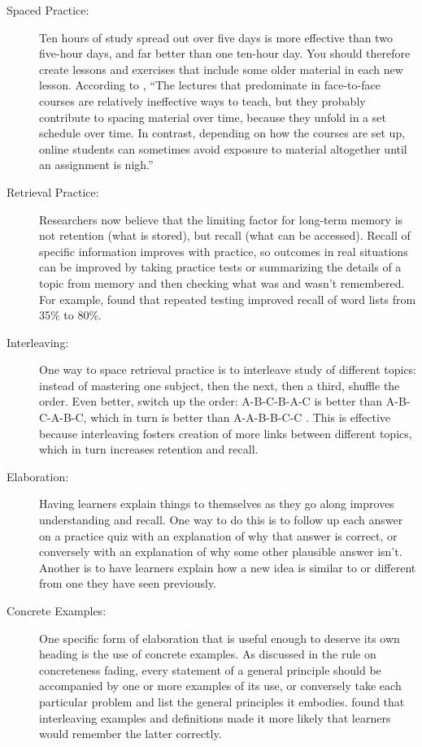 \documentclass[10pt,letterpaper]{article}
\begin{document}
\begin{description}

\item[Spaced Practice:] Ten hours of study spread out over five days is more
  effective than two five-hour days, and far better than one ten-hour day. You
  should therefore create lessons and exercises that include some older material
  in each new lesson.  According to \cite{Mill2016}, ``The lectures that
  predominate in face-to-face courses are relatively ineffective ways to teach,
  but they probably contribute to spacing material over time, because they
  unfold in a set schedule over time.  In contrast, depending on how the courses
  are set up, online students can sometimes avoid exposure to material
  altogether until an assignment is nigh.''

\item[Retrieval Practice:] Researchers now believe that the limiting factor for
  long-term memory is not retention (what is stored), but recall (what can be
  accessed).  Recall of specific information improves with practice, so outcomes
  in real situations can be improved by taking practice tests or summarizing the
  details of a topic from memory and then checking what was and wasn't
  remembered. For example, \cite{Karp2008} found that repeated testing improved
  recall of word lists from 35\% to 80\%.

\item[Interleaving:] One way to space retrieval practice is to interleave study
  of different topics: instead of mastering one subject, then the next, then a
  third, shuffle the order. Even better, switch up the order: A-B-C-B-A-C is
  better than A-B-C-A-B-C, which in turn is better than A-A-B-B-C-C
  \cite{Rohr2015}. This is effective because interleaving fosters creation of
  more links between different topics, which in turn increases retention and
  recall.

\item[Elaboration:] Having learners explain things to themselves as they go
  along improves understanding and recall. One way to do this is to follow up
  each answer on a practice quiz with an explanation of why that answer is
  correct, or conversely with an explanation of why some other plausible answer
  isn't. Another is to have learners explain how a new idea is similar to or
  different from one they have seen previously.

\item[Concrete Examples:] One specific form of elaboration that is useful enough
  to deserve its own heading is the use of concrete examples.  As discussed in
  the rule on concreteness fading, every statement of a general principle should
  be accompanied by one or more examples of its use, or conversely take each
  particular problem and list the general principles it
  embodies. \cite{Raws2014} found that interleaving examples and definitions
  made it more likely that learners would remember the latter correctly.


\end{description}
\end{document}
